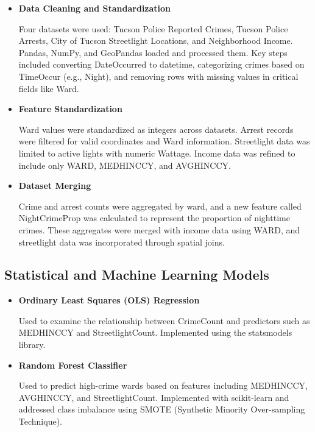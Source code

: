 \documentclass{report}
\begin{document}
\begin{itemize}
\item \textbf{Data Cleaning and Standardization}
  \par Four datasets were used: Tucson Police Reported Crimes, Tucson Police Arrests, City of Tucson Streetlight Locations, and Neighborhood Income. Pandas, NumPy, and GeoPandas loaded and processed them. Key steps included converting DateOccurred to datetime, categorizing crimes based on TimeOccur (e.g., Night), and removing rows with missing values in critical fields like Ward.
  
\item \textbf{Feature Standardization}
  \par Ward values were standardized as integers across datasets. Arrest records were filtered for valid coordinates and Ward information. Streetlight data was limited to active lights with numeric Wattage. Income data was refined to include only WARD, MEDHINC\textunderscore CY, and AVGHINC\textunderscore CY.
  
\item \textbf{Dataset Merging}
  \par Crime and arrest counts were aggregated by ward, and a new feature called Night\textunderscore Crime\textunderscore Prop was calculated to represent the proportion of nighttime crimes. These aggregates were merged with income data using WARD, and streetlight data was incorporated through spatial joins.
\end{itemize}

\subsection{Statistical and Machine Learning Models}

\begin{itemize}
\item \textbf{Ordinary Least Squares (OLS) Regression}
  \par Used to examine the relationship between Crime\textunderscore Count and predictors such as MEDHINC\textunderscore CY and Streetlight\textunderscore Count. Implemented using the statsmodels library.
  
\item \textbf{Random Forest Classifier}
  \par Used to predict high-crime wards based on features including MEDHINC\textunderscore CY, AVGHINC\textunderscore CY, and Streetlight\textunderscore Count. Implemented with scikit-learn and addressed class imbalance using SMOTE (Synthetic Minority Over-sampling Technique).
\end{itemize}
\end{document}
